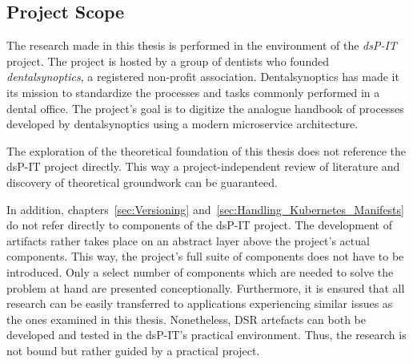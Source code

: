 
\subsection{Project Scope}%
\label{sub:Project_Scope}

The research made in this thesis is performed in the environment of the
\textit{dsP-IT} project. The project is hosted by a group of dentists who
founded \textit{dentalsynoptics}, a registered non-profit association.
Dentalsynoptics has made it its mission to standardize the processes and tasks
commonly performed in a dental office. The project's goal is to digitize the
analogue handbook of processes developed by dentalsynoptics using a modern
microservice \autocite{HomepageDentalSynoptics2018} architecture.

The exploration of the theoretical foundation of this thesis does not reference
the dsP-IT project directly. This way a project-independent review of literature
and discovery of theoretical groundwork can be guaranteed.

In addition, chapters~\ref{sec:Versioning}
and~\ref{sec:Handling_Kubernetes_Manifests} do not refer directly to components
of the dsP-IT project. The development of artifacts rather takes place on an
abstract layer above the project's actual components. This way, the project's
full suite of components does not have to be introduced. Only a select number
of components which are needed to solve the problem at hand are presented
conceptionally. Furthermore, it is ensured that all research can be easily
transferred to applications experiencing similar issues as the ones examined in
this thesis. Nonetheless, \ac{DSR} artefacts can both be developed and tested in
the dsP-IT's practical environment. Thus, the research is not bound but rather
guided by a practical project.
